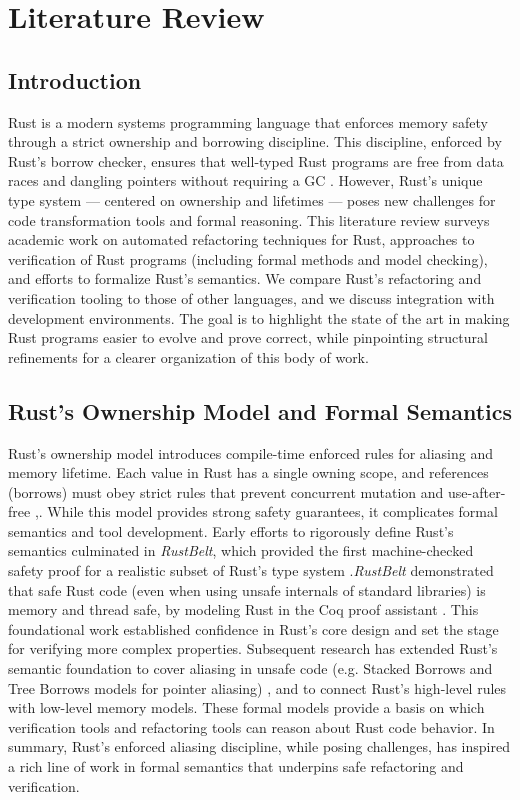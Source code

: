 \chapter[Chapter 1]{Literature Review}
\label{chap:lit_review}

\section{Introduction}
\label{sec:lit_intro}
Rust is a modern systems programming language that enforces memory safety
through a strict ownership and borrowing discipline. This discipline, enforced
by Rust's borrow checker, ensures that well-typed Rust programs are free from
data races and dangling pointers without requiring a GC
\cite{automated_refactoring_of_rust_programs}. However, Rust's unique type
system — centered on ownership and lifetimes — poses
new challenges for code transformation tools and formal reasoning. This
literature review surveys academic work on automated refactoring techniques for
Rust, approaches to verification of Rust programs (including formal methods and
model checking), and efforts to formalize Rust's semantics. We compare Rust's
refactoring and verification tooling to those of other languages, and we discuss
integration with development environments. The goal is to highlight the state of
the art in making Rust programs easier to evolve and prove correct, while
pinpointing structural refinements for a clearer organization of this body of
work.

\section{Rust's Ownership Model and Formal Semantics}
\label{sec:rust_owndership_model_formal_semantics}

Rust's ownership model introduces compile-time enforced rules for aliasing and
memory lifetime. Each value in Rust has a single owning scope, and references
(borrows) must obey strict rules that prevent concurrent mutation and
use-after-free \cite{automated_refactoring_of_rust_programs},\cite{the_rust_language}.
While this model provides strong safety guarantees, it complicates formal
semantics and tool development. Early efforts to rigorously define Rust's
semantics culminated in \textit{RustBelt}, which provided the first machine-checked
safety proof for a realistic subset of Rust's type system
\cite{RustBelt}.\textit{RustBelt} demonstrated that safe Rust code (even when
using unsafe internals of standard libraries) is memory and thread safe, by
modeling Rust in the Coq proof assistant \cite{RustBelt}. This foundational work
established confidence in Rust's core design and set the stage for verifying
more complex properties. Subsequent research has extended Rust's semantic
foundation to cover aliasing in unsafe code (e.g. Stacked Borrows and Tree
Borrows models for pointer aliasing) \cite{AENEAS_PART_2}, and to connect Rust's
high-level rules with low-level memory models. These formal models provide a
basis on which verification tools and refactoring tools can reason about Rust
code behavior. In summary, Rust's enforced aliasing discipline, while posing
challenges, has inspired a rich line of work in formal semantics that underpins
safe refactoring and verification.

